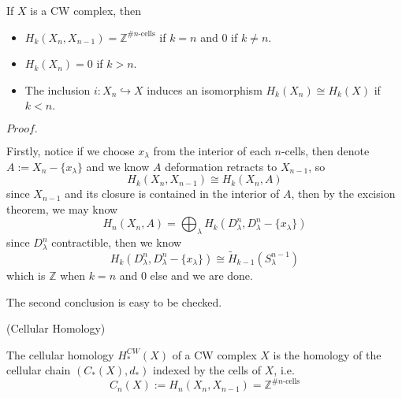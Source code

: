 \documentclass{article}
\newcommand{\Pf}[1]{$Proof.$\par}
\begin{document}
\begin{lemma}
    If $X$ is a CW complex, then
    \begin{itemize}
        \item $H_k(X_n,X_{n-1}) = \mathbb{Z}^{\# n\text{-cells}}$ if $k=n$ and $0$ if $k\neq n$.
        \item $H_k(X_n) = 0$ if $k>n$.
        \item The inclusion $i:X_n\hookrightarrow X$ induces an isomorphism $H_k(X_n) \cong H_k(X)$ if $k < n$.
    \end{itemize}
\end{lemma}
\Pf\par
    Firstly, notice if we choose $x_{\lambda}$ from the interior of each $n$-cells, then denote $A:= X_n - \{x_{\lambda}\}$ and we know $A$ deformation retracts to $X_{n-1}$, so
    \[H_k(X_n,X_{n-1}) \cong H_k(X_n,A)\]
    since $X_{n-1}$ and its closure is contained in the interior of $A$, then by the excision theorem, we may know
    \[H_n(X_n,A) = \bigoplus_{\lambda}H_k(D_{\lambda}^n,D_{\lambda}^n-\{x_{\lambda}\})\]
    since $D_{\lambda}^n$ contractible, then we know
    \[H_k(D_{\lambda}^n,D_{\lambda}^n-\{x_{\lambda}\}) \cong \widetilde{H}_{k-1}(S_{\lambda}^{n-1})\]
    which is $\mathbb{Z}$ when $k=n$ and $0$ else and we are done.\par
    The second conclusion is easy to be checked.\par

\begin{definition}(Cellular Homology)\par
    The cellular homology $H_*^{CW}(X)$ of a CW complex $X$ is the homology of the cellular chain $(C_*(X),d_*)$ indexed by the cells of $X$, i.e.
    \[C_n(X):= H_n(X_n,X_{n-1}) = \mathbb{Z}^{\# n\text{-cells}}\]
\end{definition}




\end{document}
